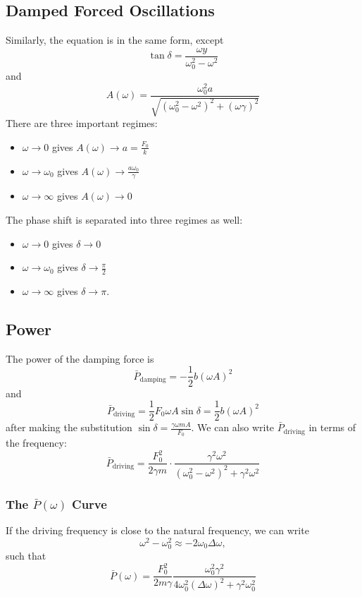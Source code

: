 \documentclass{article}
\begin{document}
\subsection{Damped Forced Oscillations}
Similarly, the equation is in the same form, except 
\begin{equation}
    \tan\delta = \frac{\omega y}{\omega_0^2-\omega^2}
\end{equation}
and 
\begin{equation}
    A(\omega) = \frac{\omega_0^2 a}{\sqrt{(\omega_0^2-\omega^2)^2 + (\omega \gamma)^2}}
\end{equation}
There are three important regimes: 
\begin{itemize}
    \item $\omega \to 0$ gives $A(\omega) \rightarrow a = \frac{F_0}{k}$
    \item $\omega \to \omega_0$ gives $A(\omega) \to \frac{a\omega_0}{\gamma}$
    \item $\omega\to\infty$ gives $A(\omega)\to 0$
\end{itemize}
The phase shift is separated into three regimes as well: 
\begin{itemize}
    \item $\omega \to 0$ gives $\delta \to 0$
    \item $\omega \to \omega_0$ gives $\delta \to \frac{\pi}{2}$
    \item $\omega\to\infty$ gives $\delta \to \pi$.
\end{itemize}

\subsection{Power}
The power of the damping force is
\begin{equation}
    \bar{P}_\text{damping}=-\frac{1}{2}b(\omega A)^2
\end{equation}
and 
\begin{equation}
    \bar{P}_\text{driving}=\frac{1}{2}F_0\omega A\sin\delta = \frac{1}{2}b(\omega A)^2 
\end{equation}
after making the substitution $\sin\delta = \frac{\gamma \omega m A}{F_0}.$ We can also write $\bar{P}_\text{driving}$ in terms of the frequency: 
\begin{equation}
    \bar{P}_\text{driving} = \frac{F_0^2}{2\gamma m}\cdot \frac{\gamma^2\omega^2}{(\omega_0^2-\omega^2)^2+\gamma^2\omega^2}
\end{equation}
\subsubsection{The $\bar{P}(\omega)$ Curve}
If the driving frequency is close to the natural frequency, we can write 
\begin{equation}
    \omega^2-\omega_0^2 \approx -2\omega_0\Delta \omega,
\end{equation}
such that 
\begin{equation}
    \bar{P}(\omega) = \frac{F_0^2}{2m\gamma} \frac{\omega_0^2\gamma^2}{4\omega_0^2(\Delta \omega)^2+\gamma^2\omega_0^2}
\end{equation}
\end{document}
